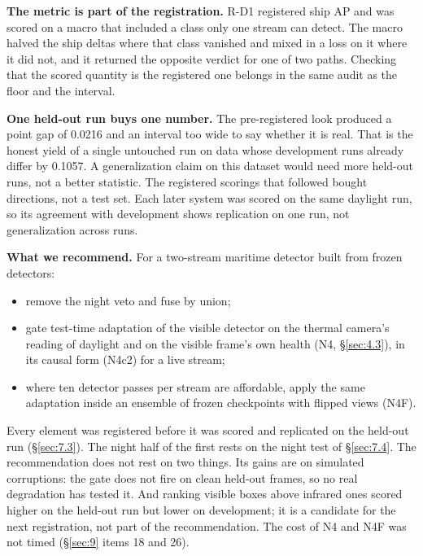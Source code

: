 \documentclass[10pt]{article}
\begin{document}
\textbf{The metric is part of the registration.} R-D1 registered ship AP and was scored on a macro that included a class only one stream can detect. The macro halved the ship deltas where that class vanished and mixed in a loss on it where it did not, and it returned the opposite verdict for one of two paths. Checking that the scored quantity is the registered one belongs in the same audit as the floor and the interval.

\textbf{One held-out run buys one number.} The pre-registered look produced a point gap of 0.0216 and an interval too wide to say whether it is real. That is the honest yield of a single untouched run on data whose development runs already differ by 0.1057. A generalization claim on this dataset would need more held-out runs, not a better statistic. The registered scorings that followed bought directions, not a test set. Each later system was scored on the same daylight run, so its agreement with development shows replication on one run, not generalization across runs.

\textbf{What we recommend.} For a two-stream maritime detector built from frozen detectors:
\begin{itemize}
\item remove the night veto and fuse by union;
\item gate test-time adaptation of the visible detector on the thermal camera's reading of daylight and on the visible frame's own health (N4, \S\ref{sec:4.3}), in its causal form (N4c2) for a live stream;
\item where ten detector passes per stream are affordable, apply the same adaptation inside an ensemble of frozen checkpoints with flipped views (N4F).
\end{itemize}

Every element was registered before it was scored and replicated on the held-out run (\S\ref{sec:7.3}). The night half of the first rests on the night test of \S\ref{sec:7.4}. The recommendation does not rest on two things. Its gains are on simulated corruptions: the gate does not fire on clean held-out frames, so no real degradation has tested it. And ranking visible boxes above infrared ones scored higher on the held-out run but lower on development; it is a candidate for the next registration, not part of the recommendation. The cost of N4 and N4F was not timed (\S\ref{sec:9} items 18 and 26).
\end{document}
